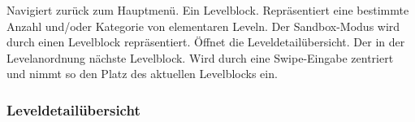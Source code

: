 \begin{center}
\setlength\fboxsep{20pt}
\setlength\fboxrule{1pt}
\end{center}

\begin{requirements}
 Navigiert zurück zum Hauptmenü.
 Ein Levelblock. Repräsentiert eine bestimmte Anzahl und/oder Kategorie von elementaren Leveln. Der Sandbox-Modus wird durch einen Levelblock repräsentiert. Öffnet die Leveldetailübersicht.
 Der in der Levelanordnung nächste Levelblock. Wird durch eine Swipe-Eingabe zentriert und nimmt so den Platz des aktuellen Levelblocks ein.
\end{requirements}

\subsubsection{Leveldetailübersicht}

\begin{center}
\setlength\fboxsep{20pt}
\setlength\fboxrule{1pt}
\end{center}

